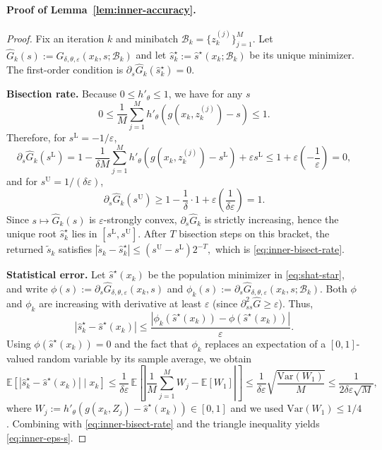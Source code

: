 \documentclass{uai2026} %
\theoremstyle{plain}
\theoremstyle{definition}
\begin{document}
\paragraph{Proof of Lemma~\ref{lem:inner-accuracy}.}
\begin{proof}
Fix an iteration $k$ and minibatch $\mathcal{B}_k=\{z_k^{(j)}\}_{j=1}^M$.
Let $\widehat G_k(s):=\widehat G_{\delta,\theta,\varepsilon}(x_k,s;\mathcal{B}_k)$ and let $\widehat s^\star_k:=\widehat s^\star(x_k;\mathcal{B}_k)$ be its unique minimizer.
The first-order condition is $\partial_s \widehat G_k(\widehat s^\star_k)=0$.

\textbf{Bisection rate.}
Because $0\le h'_\theta\le 1$, we have for any $s$
\[
  0\le \frac{1}{M}\sum_{j=1}^M h'_\theta\!\left(g(x_k,z_k^{(j)})-s\right)\le 1.
\]
Therefore, for $s^{\mathrm{L}}=-1/\varepsilon$,
\[
  \partial_s \widehat G_k(s^{\mathrm{L}})
  = 1-\frac{1}{\delta M}\sum_{j=1}^M h'_\theta(g(x_k,z_k^{(j)})-s^{\mathrm{L}})+\varepsilon s^{\mathrm{L}}
  \le 1 + \varepsilon\left(-\frac{1}{\varepsilon}\right)=0,
\]
and for $s^{\mathrm{U}}=1/(\delta\varepsilon)$,
\[
  \partial_s \widehat G_k(s^{\mathrm{U}})
  \ge 1-\frac{1}{\delta}\cdot 1 + \varepsilon\left(\frac{1}{\delta\varepsilon}\right)=1.
\]
Since $s\mapsto \widehat G_k(s)$ is $\varepsilon$-strongly convex, $\partial_s \widehat G_k$ is strictly increasing, hence the unique root $\widehat s^\star_k$ lies in $[s^{\mathrm{L}},s^{\mathrm{U}}]$.
After $T$ bisection steps on this bracket, the returned $\tilde s_k$ satisfies
$
|\tilde s_k-\widehat s^\star_k|\le (s^{\mathrm{U}}-s^{\mathrm{L}})2^{-T},
$
which is \eqref{eq:inner-bisect-rate}.

\textbf{Statistical error.}
Let $\widehat s^\star(x_k)$ be the population minimizer in \eqref{eq:shat-star}, and write $\phi(s):=\partial_s\widehat G_{\delta,\theta,\varepsilon}(x_k,s)$ and
$\phi_k(s):=\partial_s\widehat G_{\delta,\theta,\varepsilon}(x_k,s;\mathcal{B}_k)$.
Both $\phi$ and $\phi_k$ are increasing with derivative at least $\varepsilon$ (since $\partial^2_{ss}\widehat G\ge \varepsilon$).
Thus,
\[
  |\widehat s^\star_k-\widehat s^\star(x_k)|
  \le \frac{|\phi_k(\widehat s^\star(x_k))-\phi(\widehat s^\star(x_k))|}{\varepsilon}.
\]
Using $\phi(\widehat s^\star(x_k))=0$ and the fact that $\phi_k$ replaces an expectation of a $[0,1]$-valued random variable by its sample average, we obtain
\[
  \mathbb{E}\!\left[|\widehat s^\star_k-\widehat s^\star(x_k)|\mid x_k\right]
  \le \frac{1}{\delta\varepsilon}\,\mathbb{E}\!\left[\left|\frac{1}{M}\sum_{j=1}^M W_j-\mathbb{E}[W_1]\right|\right]
  \le \frac{1}{\delta\varepsilon}\sqrt{\frac{\mathrm{Var}(W_1)}{M}}
  \le \frac{1}{2\delta\varepsilon\sqrt{M}},
\]
where $W_j:=h'_\theta(g(x_k,Z_j)-\widehat s^\star(x_k))\in[0,1]$ and we used $\mathrm{Var}(W_1)\le 1/4$.
Combining with \eqref{eq:inner-bisect-rate} and the triangle inequality yields \eqref{eq:inner-eps-s}.
\end{proof}
\end{document}
